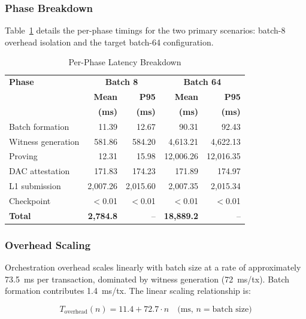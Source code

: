 \subsubsection{Phase Breakdown}

Table~\ref{tab:phases} details the per-phase timings for the two primary
scenarios: batch-8 overhead isolation and the target batch-64 configuration.

\begin{table}[htbp]
\centering
\caption{Per-Phase Latency Breakdown}
\label{tab:phases}
\begin{tabular}{lrrrr}
\toprule
\textbf{Phase} & \multicolumn{2}{c}{\textbf{Batch 8}} & \multicolumn{2}{c}{\textbf{Batch 64}} \\
               & \textbf{Mean} & \textbf{P95} & \textbf{Mean} & \textbf{P95} \\
               & \textbf{(ms)} & \textbf{(ms)} & \textbf{(ms)} & \textbf{(ms)} \\
\midrule
Batch formation     & 11.39  & 12.67  & 90.31   & 92.43 \\
Witness generation  & 581.86 & 584.20 & 4,613.21 & 4,622.13 \\
Proving             & 12.31  & 15.98  & 12,006.26 & 12,016.35 \\
DAC attestation     & 171.83 & 174.23 & 171.89  & 174.97 \\
L1 submission       & 2,007.26 & 2,015.60 & 2,007.35 & 2,015.34 \\
Checkpoint          & $<$0.01 & $<$0.01 & $<$0.01 & $<$0.01 \\
\midrule
\textbf{Total}      & \textbf{2,784.8} & -- & \textbf{18,889.2} & -- \\
\bottomrule
\end{tabular}
\end{table}

\subsubsection{Overhead Scaling}

Orchestration overhead scales linearly with batch size at a rate of
approximately 73.5~ms per transaction, dominated by witness generation
(72~ms/tx). Batch formation contributes 1.4~ms/tx. The linear scaling
relationship is:

\begin{equation}
T_\text{overhead}(n) = 11.4 + 72.7 \cdot n \quad \text{(ms, } n = \text{batch size)}
\end{equation}

